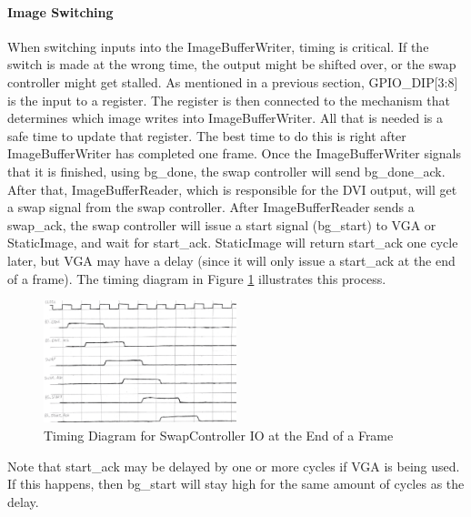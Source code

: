 \paragraph{Image Switching}
When switching inputs into the ImageBufferWriter, timing is critical. If the switch is made at the wrong time, the output might be shifted over, or the swap controller might get stalled. As mentioned in a previous section, GPIO\_DIP[3:8] is the input to a register. The register is then connected to the mechanism that determines which image writes into ImageBufferWriter. All that is needed is a safe time to update that register. The best time to do this is right after ImageBufferWriter has completed one frame. Once the ImageBufferWriter signals that it is finished, using bg\_done, the swap controller will send bg\_done\_ack. After that, ImageBufferReader, which is responsible for the DVI output, will get a swap signal from the swap controller. After ImageBufferReader sends a swap\_ack, the swap controller will issue a start signal (bg\_start) to VGA or StaticImage, and wait for start\_ack. StaticImage will return start\_ack one cycle later, but VGA may have a delay (since it will only issue a start\_ack at the end of a frame). The timing diagram in Figure \ref{fig:timing_3} illustrates this process.

\begin{figure}
    \includegraphics[width=0.5\textwidth]{processed_image_pngs/timing_3.png}
    \caption{Timing Diagram for SwapController IO at the End of a Frame}
    \label{fig:timing_3}
\end{figure}


Note that start\_ack may be delayed by one or more cycles if VGA is being used. If this happens, then bg\_start will stay high for the same amount of cycles as the delay.


